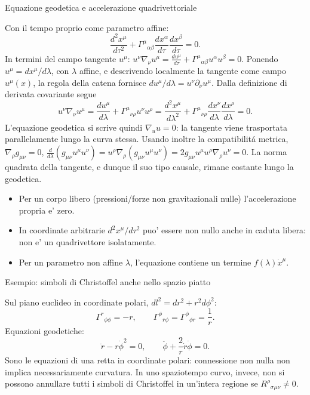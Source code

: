\begin{frame}[t]{Equazione geodetica e accelerazione quadrivettoriale}\small\raggedright
Con il tempo proprio come parametro affine:
\[
\frac{d^2x^\mu}{d\tau^2}
+\Gamma^\mu{}_{\alpha\beta}
\frac{dx^\alpha}{d\tau}\frac{dx^\beta}{d\tau}=0.
\]
In termini del campo tangente $u^\mu$: $u^\nu\nabla_\nu u^\mu=\frac{du^\mu}{d\tau}+\Gamma^\mu{}_{\alpha\beta}u^\alpha u^\beta=0$.
Ponendo $u^\mu=dx^\mu/d\lambda$, con $\lambda$ affine, e descrivendo localmente la tangente come campo $u^\mu(x)$, la regola della catena fornisce $du^\mu/d\lambda=u^\nu\partial_\nu u^\mu$. Dalla definizione di derivata covariante segue
\[
u^\nu\nabla_\nu u^\mu
=\frac{du^\mu}{d\lambda}
+\Gamma^\mu{}_{\nu\rho}u^\nu u^\rho
=\frac{d^2x^\mu}{d\lambda^2}
+\Gamma^\mu{}_{\nu\rho}
\frac{dx^\nu}{d\lambda}\frac{dx^\rho}{d\lambda}=0.
\]
L'equazione geodetica si scrive quindi $\nabla_u u=0$: la tangente viene trasportata parallelamente lungo la curva stessa. Usando inoltre la compatibilit\'a metrica, $\nabla_\rho g_{\mu\nu}=0$, $\frac{d}{d\lambda}(g_{\mu\nu}u^\mu u^\nu)=u^\rho\nabla_\rho(g_{\mu\nu}u^\mu u^\nu)=2g_{\mu\nu}u^\mu u^\rho\nabla_\rho u^\nu=0$. La norma quadrata della tangente, e dunque il suo tipo causale, rimane costante lungo la geodetica.
\begin{itemize}
\item Per un corpo libero (pressioni/forze non gravitazionali nulle) l'accelerazione propria e' zero.
\item In coordinate arbitrarie $d^2x^\mu/d\tau^2$ puo' essere non nullo anche in caduta libera: non e' un quadrivettore isolatamente.
\item Per un parametro non affine $\lambda$, l'equazione contiene un termine $f(\lambda)\dot x^\mu$.
\end{itemize}

\end{frame}

\begin{frame}[t]{Esempio: simboli di Christoffel anche nello spazio piatto}\small\raggedright
Sul piano euclideo in coordinate polari, $dl^2=dr^2+r^2d\phi^2$:
\[
\Gamma^r{}_{\phi\phi}=-r,\qquad
\Gamma^\phi{}_{r\phi}=\Gamma^\phi{}_{\phi r}=\frac1r.
\]
Equazioni geodetiche:
\[
\ddot r-r\dot\phi^2=0,\qquad
\ddot\phi+\frac2r\dot r\dot\phi=0.
\]
Sono le equazioni di una retta in coordinate polari: connessione non nulla non implica necessariamente curvatura.
In uno spaziotempo curvo, invece, non si possono annullare tutti i simboli di Christoffel in un'intera regione se $R^\rho{}_{\sigma\mu\nu}\ne0$.
\end{frame}

